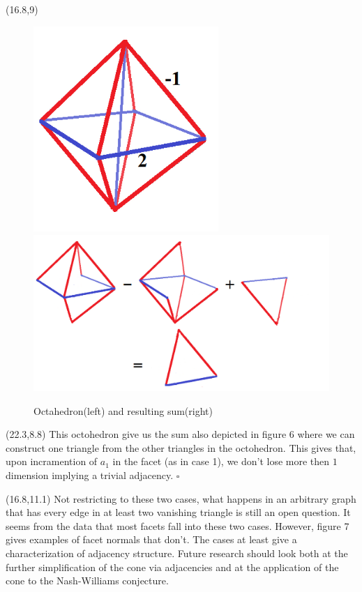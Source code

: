 \documentclass[a0,landscape]{a0poster}  %
\theoremstyle{plain}
\begin{document}
\begin{textblock}{5}(16.8,9)
\large {
\begin{figure}
\includegraphics[width=70mm,scale=0.5]{newoctahedron.png}
\hspace{1.5cm}
\includegraphics[width=150mm,scale=0.5]{newsumoctahedron.png}
\vspace{-20mm}
\caption{Octahedron(left) and resulting sum(right)}
\end{figure}

}
\end{textblock}  

\begin{textblock}{4.2}(22.3,8.8)
\large{This octohedron give us the sum also depicted in figure 6 where we can construct one triangle from the other triangles in the octohedron. This gives that, upon incramention of $a_1$ in the facet (as in case 1), we don't lose more then $1$ dimension implying a trivial adjacency. \hfill $\square$
}
\end{textblock}

\begin{textblock}{5.5}(16.8,11.1)
\large{Not restricting to these two cases, what happens in an arbitrary graph that has every edge in at least two vanishing triangle is still an open question. It seems from the data that most facets fall into these two cases. However, figure 7 gives examples of facet normals that don't. The cases at least give a characterization of adjacency structure. Future research should 
look both at the further simplification of the cone via adjacencies and at the application of the cone to the Nash-Williams conjecture. 
}
\end{textblock} 
\end{document}
